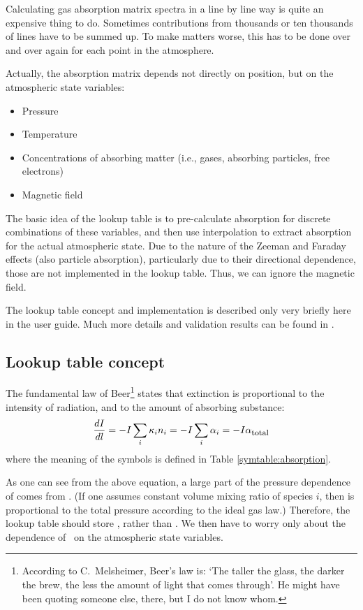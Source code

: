 Calculating gas absorption matrix spectra in a line by line way
is quite an expensive thing to do. Sometimes contributions from
thousands or ten thousands of lines have to be summed up. To make
matters worse, this has to be done over and over again for each point
in the atmosphere.

Actually, the absorption matrix depends not directly on position,
but on the atmospheric state variables:
\begin{itemize}
\item Pressure
\item Temperature
\item Concentrations of absorbing matter (i.e., gases, absorbing particles, free
electrons)
\item Magnetic field
\end{itemize}

The basic idea of the lookup table is to pre-calculate absorption for
discrete combinations of these variables, and then use interpolation
to extract absorption for the actual atmospheric state. Due to the nature of
the Zeeman and Faraday effects (also particle absorption), particularly due to
their directional dependence, those are not implemented in the lookup table.
Thus, we can ignore the magnetic field.

The lookup table concept and implementation is described only very
briefly here in the user guide. Much more details and validation
results can be found in \citet{buehler:absor:11}.

\subsection{Lookup table concept}

The fundamental law of Beer\footnote{According to C.\ Melsheimer,
  Beer's law is: `The taller the glass, the darker the brew, the less
  the amount of light that comes through'. He might have been quoting
  someone else, there, but I do not know whom.} states that extinction
is proportional to the intensity of radiation, and to the amount of
absorbing substance:
\begin{equation}
  \label{eq:lookup:beer}
  \frac{d I}{d l}
  =
  - I \sum_i {\kappa}_{i} {n}_{i}
  =
  - I \sum_i {\alpha}_{i}
  =
  - I {\alpha}_{\mbox{\footnotesize total}}
\end{equation}
where the meaning of the symbols is defined in Table
\ref{symtable:absorption}. 

As one can see from the above equation, a large part of the pressure
dependence of  comes from . (If one assumes
constant volume mixing ratio of species $i$, then  is
proportional to the total pressure according to the ideal gas law.) 
Therefore, the lookup table should store \AbsXsec, rather than
\AbsCoef. We then have to worry only about the dependence of \AbsXsec\
on the atmospheric state variables.

